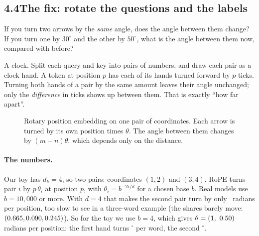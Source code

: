 
\subsection*{4.4\quad The fix: rotate the questions and the labels}

\Predict If you turn two arrows by the \emph{same} angle, does the angle between them change? If you turn
one by $30^\circ$ and the other by $50^\circ$, what is the angle between them now, compared with before?

\Picture A clock. Split each query and key into pairs of numbers, and draw each pair as a clock hand.
A token at position $p$ has each of its hands turned forward by $p$ ticks. Turning both hands of a pair by
the same amount leaves their angle unchanged; only the \emph{difference} in ticks shows up between them.
That is exactly ``how far apart''.

\begin{figure}[h]
\centering
{}
\caption{Rotary position embedding on one pair of coordinates. Each arrow is turned by its own position
times $\theta$. The angle between them changes by $(m-n)\theta$, which depends only on the distance.}
\end{figure}

\paragraph{The numbers.} Our toy has $d_k=4$, so two pairs: coordinates $(1,2)$ and $(3,4)$. RoPE turns pair
$i$ by $p\,\theta_i$ at position $p$, with $\theta_i = b^{-2i/d}$ for a chosen base $b$. Real models use
$b=10{,}000$ or more. With $d=4$ that makes the second pair turn by only \nFourBigThetaTwo\ radians per
position, too slow to see in a three-word example (the shares barely move:
$(0.665, 0.090, 0.245)$). So for the toy we use $b=4$, which gives $\theta = (\nFourThetaOne,\ \nFourThetaTwo)$
radians per position: the first hand turns \nFourDegOne$^\circ$ per word, the second \nFourDegTwo$^\circ$.

